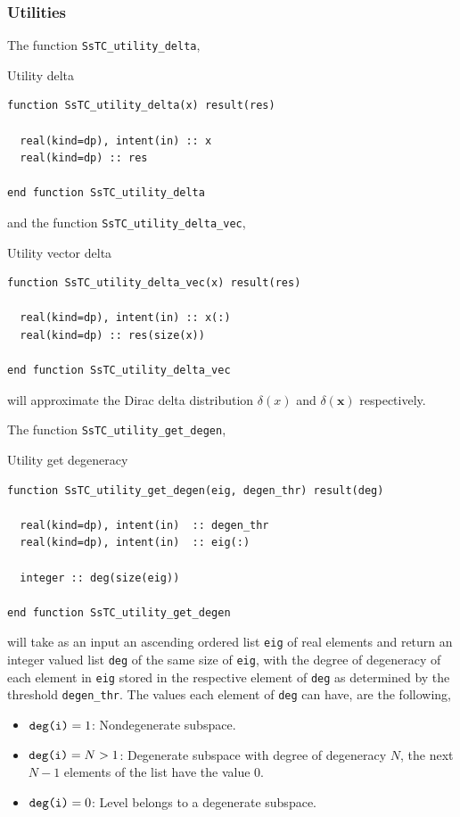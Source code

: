 \documentclass[10pt,a4paper]{article}
\begin{document}
\subsubsection{Utilities}
The function \verb|SsTC_utility_delta|,
\begin{codebox}{Utility delta}
\begin{lstlisting}[caption={Interface of ``utility delta".},captionpos=b]
function SsTC_utility_delta(x) result(res)

  real(kind=dp), intent(in) :: x
  real(kind=dp) :: res

end function SsTC_utility_delta
\end{lstlisting}
\end{codebox}
and the function \verb|SsTC_utility_delta_vec|,
\begin{codebox}{Utility vector delta}
\begin{lstlisting}[caption={Interface of ``utility delta vector".},captionpos=b]
function SsTC_utility_delta_vec(x) result(res)

  real(kind=dp), intent(in) :: x(:)
  real(kind=dp) :: res(size(x))

end function SsTC_utility_delta_vec
\end{lstlisting}
\end{codebox}
will approximate the Dirac delta distribution $\delta(x)$ and $\delta(\bm{x})$ respectively.

The function \verb|SsTC_utility_get_degen|,
\begin{codebox}{Utility get degeneracy}
\begin{lstlisting}[caption={Interface of ``utility get degeneracy of lists".},captionpos=b]
function SsTC_utility_get_degen(eig, degen_thr) result(deg)

  real(kind=dp), intent(in)  :: degen_thr
  real(kind=dp), intent(in)  :: eig(:)

  integer :: deg(size(eig))

end function SsTC_utility_get_degen
\end{lstlisting}
\end{codebox}
will take as an input an ascending ordered list \verb|eig| of real elements and return an integer valued list \verb|deg| of the same size of \verb|eig|, with the degree of degeneracy of each element in \verb|eig| stored in the respective element of \verb|deg| as determined by the threshold \verb|degen_thr|. The values each element of \verb|deg| can have, are the following,
\begin{tcolorbox}
\begin{itemize}
\item $\verb|deg(i)| = 1$: Nondegenerate subspace.
\item $\verb|deg(i)| = N>1$: Degenerate subspace with degree of degeneracy $N$, the next $N-1$ elements of the list have the value $0$.
\item $\verb|deg(i)| = 0$: Level belongs to a degenerate subspace.
\end{itemize}
\end{tcolorbox}
\end{document}
